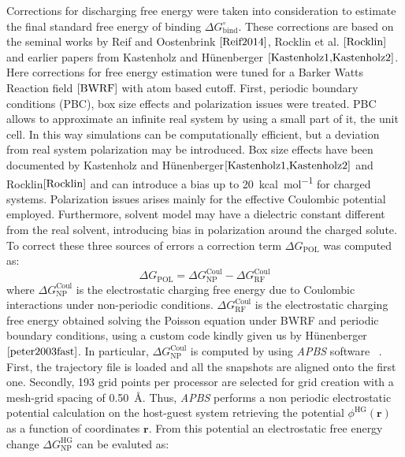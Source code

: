 \documentclass[11pt,oneside,a4paper]{article}
\begin{document}
Corrections for discharging free energy were taken into consideration to estimate the final standard free energy of binding $\Delta G_{\mathrm{bind}}^\circ$. These corrections are based on the seminal works by Reif and Oostenbrink $\cite{Reif2014}$, Rocklin et al. $\cite{Rocklin}$ and earlier papers from Kastenholz and H{\"u}nenberger $\cite{Kastenholz1,Kastenholz2}$. Here corrections for free energy estimation were tuned for a Barker Watts Reaction field $\cite{BWRF}$ with atom based cutoff.
First, periodic boundary conditions (PBC), box size effects and polarization issues were treated.
PBC allows to approximate an infinite real system by using a small part of it, the unit cell. In this way simulations can be computationally efficient, but a deviation from real system polarization may be introduced.
Box size effects have been documented by Kastenholz and H{\"u}nenberger$\cite{Kastenholz1,Kastenholz2}$ and Rocklin$\cite{Rocklin}$ and can introduce a bias up to \SI{20}{kcal.mol^{-1}} for charged systems.
Polarization issues arises mainly for the effective Coulombic potential employed. Furthermore, solvent model may have a dielectric constant different from the real solvent, introducing bias in polarization around the charged solute.
To correct these three sources of errors a correction term $\Delta G_{\mathrm{POL}}$ was computed as:
\begin{equation}
 \label{eq:DGPOL}
 \Delta G_\mathrm{POL} = \Delta G_\mathrm{NP}^\mathrm{Coul} -
			\Delta G_\mathrm{RF}^\mathrm{Coul}
\end{equation}
where $\Delta G_\mathrm{NP}^{\mathrm{Coul}}$ is the electrostatic charging free energy due to Coulombic interactions under non-periodic conditions. $\Delta G_\mathrm{RF}^\mathrm{Coul}$ is the electrostatic charging free energy obtained solving the Poisson equation under BWRF and periodic boundary conditions, using a custom code kindly given us by H{\"u}nenberger $\cite{peter2003fast}$.
In particular, $\Delta G_\mathrm{NP}^\mathrm{Coul}$ is computed by using \textit{APBS} software ~\cite{APBS}. First, the trajectory file is loaded and all the snapshots are aligned onto the first one. Secondly, 193 grid points per processor are selected for grid creation with a mesh-grid spacing of \SI{0.50}{\AA}. Thus, \textit{APBS} performs a non periodic electrostatic potential calculation on the host-guest system retrieving the potential $\phi^\mathrm{HG}(\mathbf{r})$ as a function of coordinates $\mathbf{r}$. From this potential an electrostatic free energy change $\Delta G_\mathrm{NP}^\mathrm{HG}$ can be evaluted as:
\end{document}
